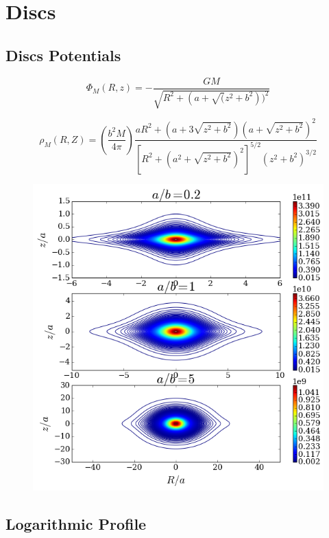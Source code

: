 \chapter{Discs}
\label{sec:Discs}
\section{Discs Potentials}

\begin{equation}
\Phi_M (R, z) = - \dfrac{GM}{\sqrt{R^2 + (a + \sqrt(z^2 + b^2))^2}}
\end{equation}

\begin{equation}
\rho_M (R, Z) = \left( \dfrac{b^2 M}{4 \pi} \right) \dfrac{aR^2 + (a + 3\sqrt{z^2+b^2})(a + \sqrt{z^2+b^2})^2}{[R^2 + (a^2 + \sqrt{z^2+b^2})^2]^{5/2}(z^2+b^2)^{3/2} }
\end{equation}


\begin{figure}[H]\label{fig:MN_density}
\centering
\includegraphics[scale=0.7]{../figures/MN_density_contours.png}
\end{figure}

\section{Logarithmic Profile}\label{sec:log}

